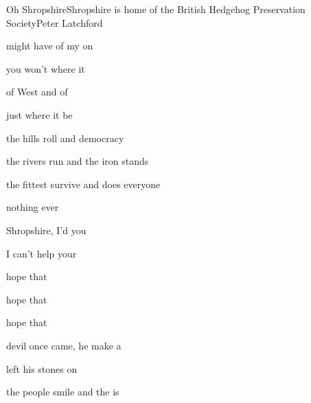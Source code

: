 \begin{SBSong}{Oh Shropshire}{Shropshire is home of the British Hedgehog Preservation Society}{Peter Latchford}
  \begin{SBVerse}
     might have  of my  on 

     you won't  where it 

     of West and  of 

     just where it  be
  \end{SBVerse}

  \begin{SBVerse}
     the hills roll  and democracy 

     the rivers run  and the iron  stands

     the fittest survive and  does everyone 

     nothing ever 
  \end{SBVerse}

  \begin{SBChorus}
     Shropshire, I'd  you 

     I can't help  your 

     hope that  

     hope that  

     hope that  
  \end{SBChorus}

  \begin{SBVerse}
     devil once came, he  make a 

     left his stones on 

     the people smile and the  is 


\end{SBVerse}
\end{SBSong}

